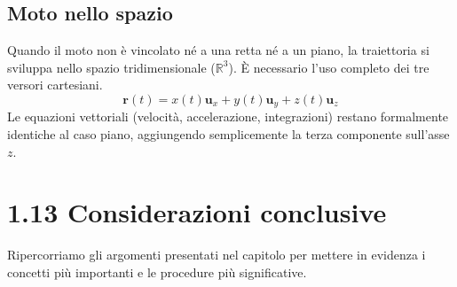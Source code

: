 \documentclass[12pt]{article}
\begin{document}
\vspace{0.3cm}
\begin{center}
\end{center}
\vspace{0.3cm}

\subsection*{Moto nello spazio}
Quando il moto non è vincolato né a una retta né a un piano, la traiettoria si sviluppa nello spazio tridimensionale ($\mathbb{R}^3$). È necessario l'uso completo dei tre versori cartesiani.
\begin{equation}
\mathbf{r}(t) = x(t)\mathbf{u}_x + y(t)\mathbf{u}_y + z(t)\mathbf{u}_z
\end{equation}
Le equazioni vettoriali (velocità, accelerazione, integrazioni) restano formalmente identiche al caso piano, aggiungendo semplicemente la terza componente sull'asse $z$.

\vspace{0.3cm}
\begin{center}
\end{center}
\vspace{0.3cm}

\newpage
\section*{1.13 Considerazioni conclusive}

Ripercorriamo gli argomenti presentati nel capitolo per mettere in evidenza i concetti più importanti e le procedure più significative.
\end{document}
